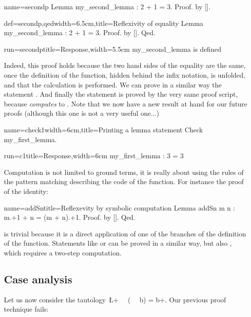 \begin{coqdef}{name=secondp}
Lemma my_second_lemma : 2 + 1 = 3.
Proof. by [].
\end{coqdef}
\begin{coq}{def=secondp,qed}{width=6.5cm,title=Reflexivity of equality}
Lemma my_second_lemma : 2 + 1 = 3.
Proof. by []. Qed.
\end{coq}
\begin{coqout}{run=secondp}{title=Response,width=5.5cm}
my_second_lemma is defined
\end{coqout}


Indeed, this proof holds because the two hand sides of the equality
are the same, once the definition of the  function, hidden
behind the infix \C{=} notation, is unfolded, and that the calculation
is performed. We can prove in a similar way the statement . And finally the statement  is proved by the very same
proof script, because  \emph{computes} to
.
Note that we now have a new result at hand for our future proofs
(although this one is not a very useful one...)

\begin{coq}{name=check1}{width=6cm,title=Printing a lemma statement}
Check my_first_lemma.
\end{coq}
\begin{coqout}{run=c1}{title=Response,width=6cm}
my_first_lemma : 3 = 3
\end{coqout}

Computation is not limited to ground terms, it is really about using
the rules of the pattern matching describing the code of the
function. 
For instance the proof of the  identity:


\begin{coq}{name=addSn}{title=Reflexevity by symbolic computation}
Lemma addSn m n : m.+1 + n = (m + n).+1. Proof. by []. Qed.
\end{coq}
is trivial because it is a direct application of one of the branches
of the definition of the  function. Statements like
 or  can be proved in a similar way, but
also , which requires a two-step computation.

\subsection{Case analysis}\label{ssec:case}
Let us now consider the tautology~\L+~~ (~~ b) = b+. Our previous
proof technique fails:

